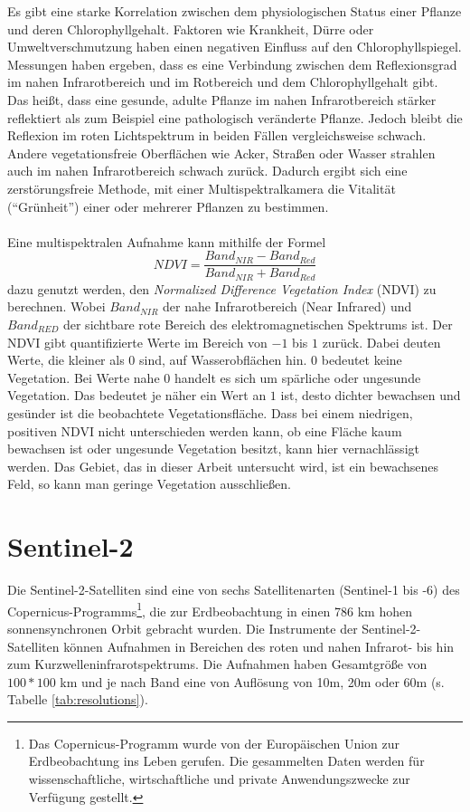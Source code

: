 Es gibt eine starke Korrelation zwischen dem physiologischen Status einer Pflanze und deren Chlorophyllgehalt. Faktoren wie Krankheit, Dürre oder Umweltverschmutzung haben einen negativen Einfluss auf den Chlorophyllspiegel.\cite{ref:hendry} Messungen haben ergeben, dass es eine Verbindung zwischen dem Reflexionsgrad im nahen Infrarotbereich und im Rotbereich und dem Chlorophyllgehalt gibt. Das heißt, dass eine gesunde, adulte Pflanze im nahen Infrarotbereich stärker reflektiert als zum Beispiel eine pathologisch veränderte Pflanze. Jedoch bleibt die Reflexion im roten Lichtspektrum in beiden Fällen vergleichsweise schwach. Andere vegetationsfreie Oberflächen wie Acker, Straßen oder Wasser strahlen auch im nahen Infrarotbereich schwach zurück. Dadurch ergibt sich eine zerstörungsfreie Methode, mit einer Multispektralkamera die Vitalität ("`Grünheit"') einer oder mehrerer Pflanzen zu bestimmen.\cite{ref:anatoly} \\\\
Eine multispektralen Aufnahme kann mithilfe der Formel 
\begin{equation}\label{equation:ndvi}
	NDVI = \frac{Band_{NIR} - Band_{Red}} {Band_{NIR} + Band_{Red}}
\end{equation}
dazu genutzt werden, den \textit{Normalized Difference Vegetation Index} (NDVI) zu berechnen. Wobei $Band_{NIR}$ der nahe Infrarotbereich (Near Infrared) und $Band_{RED}$ der sichtbare rote Bereich des elektromagnetischen Spektrums ist. Der NDVI gibt quantifizierte Werte im Bereich von $-1$ bis $1$ zurück. Dabei deuten Werte, die kleiner als $0$ sind, auf Wasserobflächen hin. $0$ bedeutet keine Vegetation. Bei Werte nahe $0$ handelt es sich um spärliche oder ungesunde Vegetation. Das bedeutet je näher ein Wert an $1$ ist, desto dichter bewachsen und gesünder ist die beobachtete Vegetationsfläche.\cite{ref:nasa} Dass bei einem niedrigen, positiven NDVI nicht unterschieden werden kann, ob eine Fläche kaum bewachsen ist oder ungesunde Vegetation besitzt, kann hier vernachlässigt werden. Das Gebiet, das in dieser Arbeit untersucht wird, ist ein bewachsenes Feld, so kann man geringe Vegetation ausschließen.

\section{Sentinel-2}\label{sec:sentinel2}

Die Sentinel-2-Satelliten sind eine von sechs Satellitenarten (Sentinel-1 bis -6) des Copernicus-Programms\footnote{Das Copernicus-Programm wurde von der Europäischen Union zur Erdbeobachtung ins Leben gerufen. Die gesammelten Daten werden für wissenschaftliche, wirtschaftliche und private Anwendungszwecke zur Verfügung gestellt.\cite{ref:copernicus}}, die zur Erdbeobachtung in einen 786 km hohen sonnensynchronen Orbit gebracht wurden. Die Instrumente der Sentinel-2-Satelliten können Aufnahmen in Bereichen des roten und nahen Infrarot- bis hin zum Kurzwelleninfrarotspektrums. Die Aufnahmen haben Gesamtgröße von $100*100$ km und je nach Band eine von Auflösung von 10m, 20m oder 60m (s. Tabelle \ref{tab:resolutions}).

